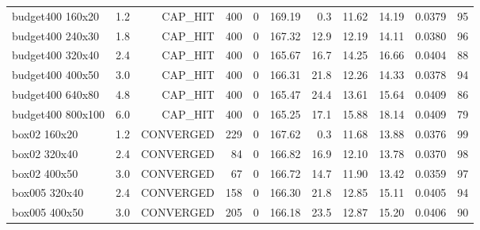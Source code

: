 \begin{tabular}{lrrrrrrrrrr}
budget400 160x20 & 1.2 & CAP\_HIT & 400 & 0 & 169.19 & 0.3 & 11.62 & 14.19 & 0.0379 & 95 \\
budget400 240x30 & 1.8 & CAP\_HIT & 400 & 0 & 167.32 & 12.9 & 12.19 & 14.11 & 0.0380 & 96 \\
budget400 320x40 & 2.4 & CAP\_HIT & 400 & 0 & 165.67 & 16.7 & 14.25 & 16.66 & 0.0404 & 88 \\
budget400 400x50 & 3.0 & CAP\_HIT & 400 & 0 & 166.31 & 21.8 & 12.26 & 14.33 & 0.0378 & 94 \\
budget400 640x80 & 4.8 & CAP\_HIT & 400 & 0 & 165.47 & 24.4 & 13.61 & 15.64 & 0.0409 & 86 \\
budget400 800x100 & 6.0 & CAP\_HIT & 400 & 0 & 165.25 & 17.1 & 15.88 & 18.14 & 0.0409 & 79 \\
box02 160x20 & 1.2 & CONVERGED & 229 & 0 & 167.62 & 0.3 & 11.68 & 13.88 & 0.0376 & 99 \\
box02 320x40 & 2.4 & CONVERGED & 84 & 0 & 166.82 & 16.9 & 12.10 & 13.78 & 0.0370 & 98 \\
box02 400x50 & 3.0 & CONVERGED & 67 & 0 & 166.72 & 14.7 & 11.90 & 13.42 & 0.0359 & 97 \\
box005 320x40 & 2.4 & CONVERGED & 158 & 0 & 166.30 & 21.8 & 12.85 & 15.11 & 0.0405 & 94 \\
box005 400x50 & 3.0 & CONVERGED & 205 & 0 & 166.18 & 23.5 & 12.87 & 15.20 & 0.0406 & 90 \\
\bottomrule
\end{tabular}
